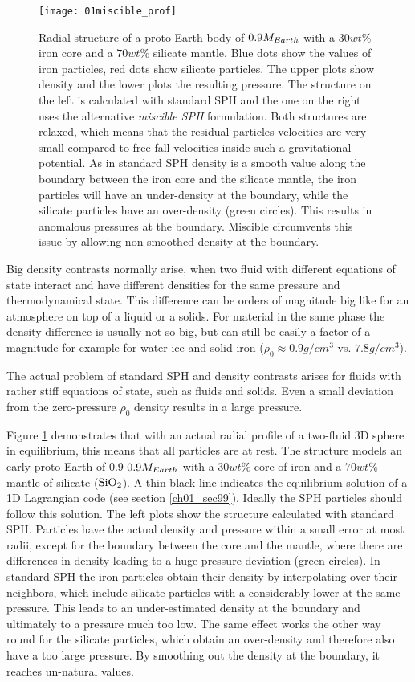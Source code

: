 \begin{figure}[htbp]
\begin{center}
\texttt{[image: 01miscible\_prof]}
\caption{Radial structure of a proto-Earth body of $0.9M_{Earth}$ with a $30wt\%$ iron core and a $70wt\%$ silicate mantle. Blue dots show the values of iron particles, red dots show silicate particles. The upper plots show density and the lower plots the resulting pressure. The structure on the left is calculated with standard SPH and the one on the right uses the alternative \emph{miscible SPH} formulation. Both structures are relaxed, which means that the residual particles velocities are very small compared to free-fall velocities inside such a gravitational potential. As in standard SPH density is a smooth value along the boundary between the iron core and the silicate mantle, the iron particles will have an under-density at the boundary, while the silicate particles have an over-density (green circles). This results in anomalous pressures at the boundary. Miscible circumvents this issue by allowing non-smoothed density at the boundary.}
\label{ch02_fig01}
\end{center}
\end{figure}

Big density contrasts normally arise, when two fluid with different equations of state interact and have different densities for the same pressure and thermodynamical state. This difference can be orders of magnitude big like for an atmosphere on top of a liquid or a solids. For material in the same phase the density difference is usually not so big, but can still be easily a factor of a magnitude for example for water ice and solid iron ($\rho_0 \approx 0.9 g/cm^3$ vs. $7.8 g/cm^3$).

The actual problem of standard SPH and density contrasts arises for fluids with rather stiff equations of state, such as fluids and solids. Even a small deviation from the zero-pressure $\rho_0$ density results in a large pressure. 

Figure \ref{ch02_fig01} demonstrates that with an actual radial profile of a two-fluid 3D sphere in equilibrium, this means that all particles are at rest. The structure models an early proto-Earth of 0.9 $0.9 M_{Earth}$ with a $30 wt\%$ core of iron and a $70 wt\%$ mantle of silicate ($\mathrm{SiO}_2$). A thin black line indicates the equilibrium solution of a 1D Lagrangian code (see section \ref{ch01_sec99}). Ideally the SPH particles should follow this solution. The left plots show the structure calculated with standard SPH. Particles have the actual density and pressure within a small error at most radii, except for the boundary between the core and the mantle, where there are differences in density leading to a huge pressure deviation (green circles). In standard SPH the iron particles obtain their density by interpolating over their neighbors, which include silicate particles with a considerably lower at the same pressure. This leads to an under-estimated density at the boundary and ultimately to a pressure much too low. The same effect works the other way round for the silicate particles, which obtain an over-density and therefore also have a too large pressure.  By smoothing out the density at the boundary, it reaches un-natural values. 

